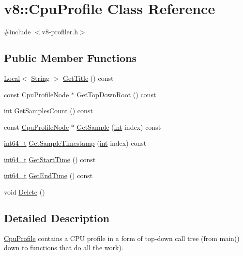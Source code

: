 \hypertarget{classv8_1_1CpuProfile}{}\section{v8\+:\+:Cpu\+Profile Class Reference}
\label{classv8_1_1CpuProfile}


{\ttfamily \#include $<$v8-\/profiler.\+h$>$}

\subsection*{Public Member Functions}
\begin{DoxyCompactItemize}
\item 
\mbox{\hyperlink{classv8_1_1Local}{Local}}$<$ \mbox{\hyperlink{classv8_1_1String}{String}} $>$ \mbox{\hyperlink{classv8_1_1CpuProfile_a4e0e9bfbd38c9bdc7f89df7321f538d8}{Get\+Title}} () const
\item 
const \mbox{\hyperlink{classv8_1_1CpuProfileNode}{Cpu\+Profile\+Node}} $\ast$ \mbox{\hyperlink{classv8_1_1CpuProfile_a0078414604a4d7617809281e650cb9d6}{Get\+Top\+Down\+Root}} () const
\item 
\mbox{\hyperlink{classint}{int}} \mbox{\hyperlink{classv8_1_1CpuProfile_a26d1c490bd4e36090ed75706cbaf64fe}{Get\+Samples\+Count}} () const
\item 
const \mbox{\hyperlink{classv8_1_1CpuProfileNode}{Cpu\+Profile\+Node}} $\ast$ \mbox{\hyperlink{classv8_1_1CpuProfile_a796377a4fae5c5724effb389ae8d19f8}{Get\+Sample}} (\mbox{\hyperlink{classint}{int}} index) const
\item 
\mbox{\hyperlink{classint64__t}{int64\+\_\+t}} \mbox{\hyperlink{classv8_1_1CpuProfile_a7c243a327e65455f087c738c570ddae8}{Get\+Sample\+Timestamp}} (\mbox{\hyperlink{classint}{int}} index) const
\item 
\mbox{\hyperlink{classint64__t}{int64\+\_\+t}} \mbox{\hyperlink{classv8_1_1CpuProfile_a9f7a7d6a8cdc68bad1016a428eef4cd0}{Get\+Start\+Time}} () const
\item 
\mbox{\hyperlink{classint64__t}{int64\+\_\+t}} \mbox{\hyperlink{classv8_1_1CpuProfile_a56f1dce6cc312c207d58131bde5c8fb8}{Get\+End\+Time}} () const
\item 
void \mbox{\hyperlink{classv8_1_1CpuProfile_a70c93f0c14d07a7e1bad42ee95665ca0}{Delete}} ()
\end{DoxyCompactItemize}


\subsection{Detailed Description}
\mbox{\hyperlink{classv8_1_1CpuProfile}{Cpu\+Profile}} contains a C\+PU profile in a form of top-\/down call tree (from main() down to functions that do all the work). 

